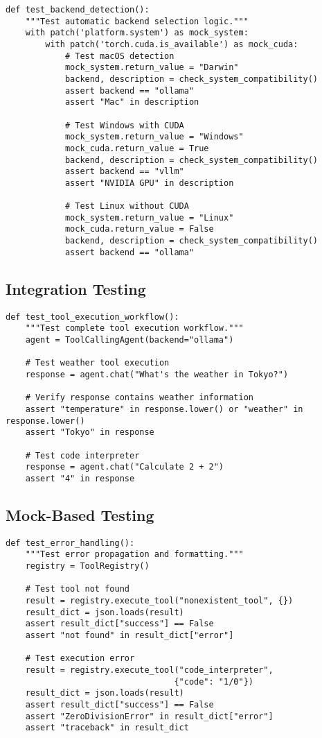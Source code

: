 \documentclass{article}
\begin{document}
\begin{lstlisting}[caption=Backend Detection Testing]
def test_backend_detection():
    """Test automatic backend selection logic."""
    with patch('platform.system') as mock_system:
        with patch('torch.cuda.is_available') as mock_cuda:
            # Test macOS detection
            mock_system.return_value = "Darwin"
            backend, description = check_system_compatibility()
            assert backend == "ollama"
            assert "Mac" in description

            # Test Windows with CUDA
            mock_system.return_value = "Windows"
            mock_cuda.return_value = True
            backend, description = check_system_compatibility()
            assert backend == "vllm"
            assert "NVIDIA GPU" in description

            # Test Linux without CUDA
            mock_system.return_value = "Linux"
            mock_cuda.return_value = False
            backend, description = check_system_compatibility()
            assert backend == "ollama"
\end{lstlisting}

\subsection{Integration Testing}

\begin{lstlisting}[caption=Tool Execution Integration Test]
def test_tool_execution_workflow():
    """Test complete tool execution workflow."""
    agent = ToolCallingAgent(backend="ollama")

    # Test weather tool execution
    response = agent.chat("What's the weather in Tokyo?")

    # Verify response contains weather information
    assert "temperature" in response.lower() or "weather" in response.lower()
    assert "Tokyo" in response

    # Test code interpreter
    response = agent.chat("Calculate 2 + 2")
    assert "4" in response
\end{lstlisting}

\subsection{Mock-Based Testing}

\begin{lstlisting}[caption=Mock Testing Strategy]
def test_error_handling():
    """Test error propagation and formatting."""
    registry = ToolRegistry()

    # Test tool not found
    result = registry.execute_tool("nonexistent_tool", {})
    result_dict = json.loads(result)
    assert result_dict["success"] == False
    assert "not found" in result_dict["error"]

    # Test execution error
    result = registry.execute_tool("code_interpreter",
                                  {"code": "1/0"})
    result_dict = json.loads(result)
    assert result_dict["success"] == False
    assert "ZeroDivisionError" in result_dict["error"]
    assert "traceback" in result_dict
\end{lstlisting}
\end{document}
